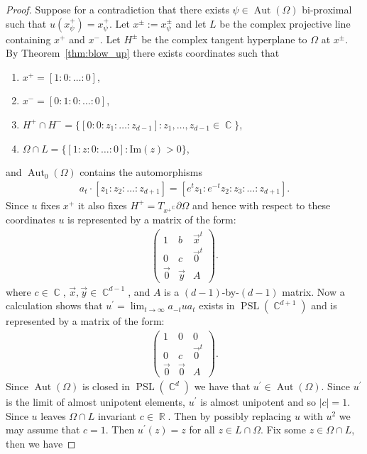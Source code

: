 \documentclass[12pt]{amsart}
\theoremstyle{plain}
\theoremstyle{definition}
\theoremstyle{remark}
\begin{document}
\begin{proof}
Suppose for a contradiction that there exists $\psi \in \operatorname{Aut}(\Omega)$ bi-proximal such that $u(x^+_{\psi}) = x^+_{\psi}$. Let $x^\pm := x^\pm_{\psi}$ and let $L$ be the complex projective line containing $x^+$ and $x^-$. Let $H^\pm$ be the complex tangent hyperplane to $\Omega$ at $x^\pm$. By Theorem~\ref{thm:blow_up} there exists coordinates such that
\begin{enumerate}
\item $x^+ = [1:0:\dots:0]$,
\item $x^- = [0:1:0: \dots :0]$,
\item $H^+ \cap H^- = \{ [0:0:z_1:\dots:z_{d-1}] : z_1, \dots, z_{d-1} \in \operatorname{\mathbb{C}}\}$,
\item $ \Omega \cap L = \{ [ 1: z : 0 : \dots : 0] : \textrm{Im}(z) >0\}$,
\end{enumerate}
and $\operatorname{Aut}_0(\Omega)$ contains the automorphisms
\begin{align*}
a_t \cdot [z_1 : z_2 : \dots : z_{d+1}] = [e^t z_1 : e^{-t} z_2 : z_3 : \dots : z_{d+1}].
\end{align*}
Since $u$ fixes $x^+$ it also fixes $H^+=T_{x^+}^\operatorname{\mathbb{C}} \partial \Omega$ and hence with respect to these coordinates $u$ is represented by a matrix of the form:
\begin{align*}
\begin{pmatrix}
1 & b & \vec{x}^t \\
0 & c & \vec{0}^t \\
\vec{0} & \vec{y} & A 
\end{pmatrix}.
\end{align*}
where $c \in \operatorname{\mathbb{C}}$, $\vec{x},\vec{y} \in \operatorname{\mathbb{C}}^{d-1}$, and $A$ is a $(d-1)$-by-$(d-1)$ matrix. Now a calculation shows that $u^\prime=\lim_{t \rightarrow \infty} a_{-t} u a_t$ exists in $\operatorname{PSL}(\operatorname{\mathbb{C}}^{d+1})$ and  is represented by a matrix of the form:
\begin{align*}
\begin{pmatrix}
1 & 0 & 0\\
0 & c & \vec{0}^t \\
\vec{0} & \vec{0} & A 
\end{pmatrix}.
\end{align*}
Since $\operatorname{Aut}(\Omega)$ is closed in $\operatorname{PSL}(\operatorname{\mathbb{C}}^d)$ we have that $u^\prime \in \operatorname{Aut}(\Omega)$. Since $u^\prime$ is the limit of almost unipotent elements, $u^\prime$ is almost unipotent and so ${\left|{c}\right|}=1$. Since $u$ leaves $\Omega \cap L$ invariant $c \in \operatorname{\mathbb{R}}$. Then by possibly replacing $u$ with $u^2$ we may assume that $c=1$. Then $u^\prime(z)=z$ for all $z \in L \cap \Omega$. Fix some $z \in \Omega \cap L$, then we have

\end{proof}
\end{document}

